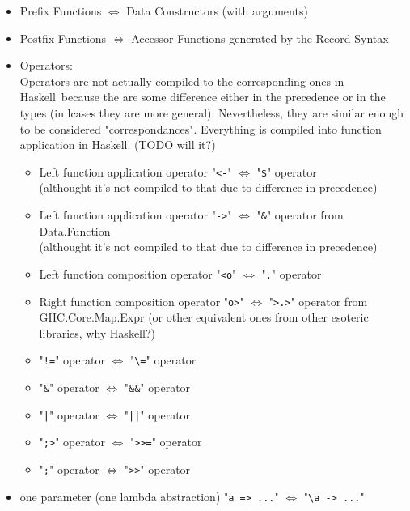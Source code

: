 \documentclass{article}
\def\H{Haskell}
\def\r{$\Longleftrightarrow$ }
\begin{document}
\begin{itemize}
\item
Prefix Functions \r Data Constructors (with arguments)
\item
Postfix Functions \r Accessor Functions generated by the Record Syntax
\item
Operators:
\\
Operators are not actually compiled to the corresponding ones in \H\ because
the are some difference either in the precedence or in the types (in lcases
they are more general). Nevertheless, they are similar enough to be considered
"correspondances". Everything is compiled into function application in \H. 
(TODO will it?)
\begin{itemize}
\item
Left function application operator "\verb|<-|" \r "\verb|$|" operator
\\
(althought it's not compiled to that due to difference in precedence)

\item
Left function application operator "\verb|->|" \r
"\verb|&|" operator from Data.Function
\\
(althought it's not compiled to that due to difference in precedence)

\item
Left function composition operator "\verb|<o|" \r "\verb|.|" operator

\item
Right function composition operator "\verb|o>|" \r 
"\verb|>.>|" operator from GHC.Core.Map.Expr (or other equivalent ones from
other esoteric libraries, why \H?)

\item
"\verb|!=|" operator \r "\verb|\=|" operator 

\item
"\verb|&|" operator \r "\verb|&&|" operator 

\item
"\texttt{|}" operator \r "\texttt{||}" operator 

\item
"\verb|;>|" operator \r "\verb|>>=|" operator 

\item
"\verb|;|" operator \r "\verb|>>|" operator 

\end{itemize}

\item
one parameter (one lambda abstraction) "\verb|a => ...|" \r
"\verb|\a -> ...|"


\end{itemize}
\end{document}

